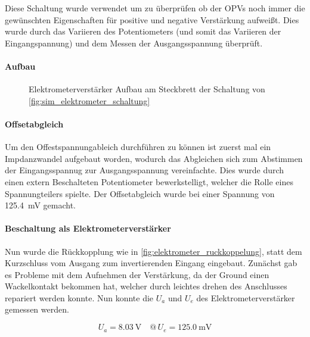 \documentclass[12pt,english,ngerman]{scrartcl}
\begin{document}
Diese Schaltung wurde verwendet um zu überprüfen ob der OPVs noch immer die
gewünschten Eigenschaften für positive und negative Verstärkung aufweißt. Dies
wurde durch das Variieren des Potentiometers (und somit das Variieren der
Eingangspannung) und dem Messen der Ausgangsspannung überprüft.

\paragraph{Aufbau}

\begin{figure}[H]
  \centering
  \caption{Elektrometerverstärker Aufbau am Steckbrett der Schaltung von
  \autoref{fig:sim_elektrometer_schaltung}}
  \label{fig:ver_elektromete_aufbau}
\end{figure}

\paragraph{Offsetabgleich}
Um den Offestspannungableich durchführen zu können ist zuerst mal ein
Impdanzwandel aufgebaut worden, wodurch das Abgleichen sich zum Abstimmen
der Eingangsspannug zur Ausgangsspannung vereinfachte. Dies wurde durch einen
extern Beschalteten Potentiometer bewerkstelligt, welcher die Rolle eines
Spannungteilers spielte. Der Offsetabgleich wurde bei einer Spannung von
\SI{125.4}{\milli\volt} gemacht.

\paragraph{Beschaltung als Elektrometerverstärker}
Nun wurde die Rückkopplung wie in \autoref{fig:elektrometer_ruckkoppelung},
statt dem Kurzschluss vom Ausgang zum invertierenden Eingang eingebaut.
Zunächst gab es Probleme mit dem Aufnehmen der Verstärkung, da der Ground einen
Wackelkontakt bekommen hat, welcher durch leichtes drehen des Anschlusses
repariert werden konnte.
Nun konnte die $U_a$ und $U_e$ des Elektrometerverstärker gemessen werden.

\begin{equation}
  U_a = \SI{8.03}{\volt} \quad @\, U_e = \SI{125.0}{\milli\volt}
  \label{eq:messwert_elektro_ausgang_eingang}
\end{equation}
\end{document}
